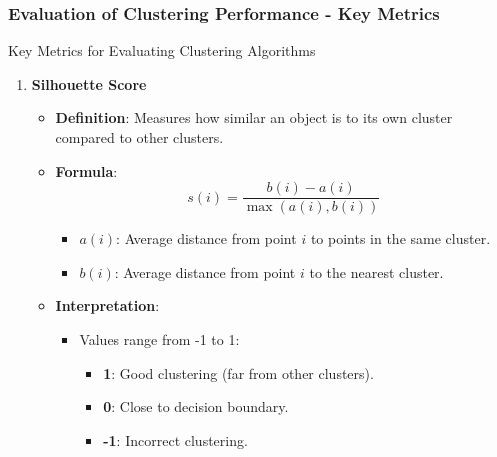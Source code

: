 \documentclass[aspectratio=169]{beamer}
\begin{document}
\begin{frame}[fragile]
    \frametitle{Evaluation of Clustering Performance - Key Metrics}
    \begin{block}{Key Metrics for Evaluating Clustering Algorithms}
        \begin{enumerate}
            \item \textbf{Silhouette Score}
            \begin{itemize}
                \item \textbf{Definition}: Measures how similar an object is to its own cluster compared to other clusters.
                \item \textbf{Formula}:
                \begin{equation}
                    s(i) = \frac{b(i) - a(i)}{\max(a(i), b(i))}
                \end{equation}
                \begin{itemize}
                    \item $a(i)$: Average distance from point $i$ to points in the same cluster.
                    \item $b(i)$: Average distance from point $i$ to the nearest cluster.
                \end{itemize}
                \item \textbf{Interpretation}:
                \begin{itemize}
                    \item Values range from -1 to 1:
                    \begin{itemize}
                        \item \textbf{1}: Good clustering (far from other clusters).
                        \item \textbf{0}: Close to decision boundary.
                        \item \textbf{-1}: Incorrect clustering.
                    \end{itemize}
                \end{itemize}
            \end{itemize}


\end{enumerate}
\end{block}
\end{frame}
\end{document}

